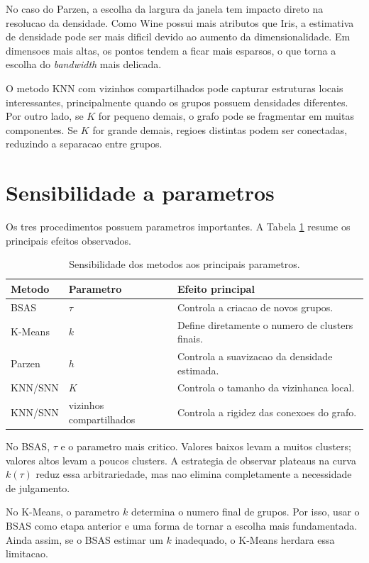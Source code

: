 \documentclass[12pt,a4paper]{article}
\begin{document}
No caso do Parzen, a escolha da largura da janela tem impacto direto na
resolucao da densidade. Como Wine possui mais atributos que Iris, a estimativa
de densidade pode ser mais dificil devido ao aumento da dimensionalidade. Em
dimensoes mais altas, os pontos tendem a ficar mais esparsos, o que torna a
escolha do \textit{bandwidth} mais delicada.

O metodo KNN com vizinhos compartilhados pode capturar estruturas locais
interessantes, principalmente quando os grupos possuem densidades diferentes.
Por outro lado, se $K$ for pequeno demais, o grafo pode se fragmentar em muitas
componentes. Se $K$ for grande demais, regioes distintas podem ser conectadas,
reduzindo a separacao entre grupos.

\section{Sensibilidade a parametros}

Os tres procedimentos possuem parametros importantes. A Tabela
\ref{tab:parametros} resume os principais efeitos observados.

\begin{table}[h]
\centering
\caption{Sensibilidade dos metodos aos principais parametros.}
\label{tab:parametros}
\begin{tabular}{lll}
\toprule
Metodo & Parametro & Efeito principal \\
\midrule
BSAS & $\tau$ & Controla a criacao de novos grupos. \\
K-Means & $k$ & Define diretamente o numero de clusters finais. \\
Parzen & $h$ & Controla a suavizacao da densidade estimada. \\
KNN/SNN & $K$ & Controla o tamanho da vizinhanca local. \\
KNN/SNN & vizinhos compartilhados & Controla a rigidez das conexoes do grafo. \\
\bottomrule
\end{tabular}
\end{table}

No BSAS, $\tau$ e o parametro mais critico. Valores baixos levam a muitos
clusters; valores altos levam a poucos clusters. A estrategia de observar
plateaus na curva $k(\tau)$ reduz essa arbitrariedade, mas nao elimina
completamente a necessidade de julgamento.

No K-Means, o parametro $k$ determina o numero final de grupos. Por isso, usar o
BSAS como etapa anterior e uma forma de tornar a escolha mais fundamentada.
Ainda assim, se o BSAS estimar um $k$ inadequado, o K-Means herdara essa
limitacao.
\end{document}
